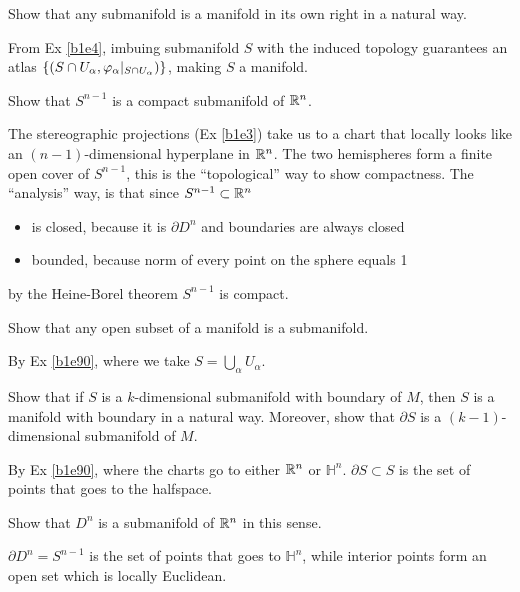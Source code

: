 \documentclass[10pt]{article}
\begin{document}
\begin{example}\label{b1e90}
	Show that any submanifold is a manifold in its own right in a natural way.
\end{example}
\sol From Ex \ref{b1e4}, imbuing submanifold $S$ with the induced topology guarantees an atlas $\lbrace(S \cap U_\alpha, \varphi_\alpha|_{S \cap U_\alpha})\rbrace$, making $S$ a manifold.


\begin{example}
	Show that $S^{n-1}$ is a compact submanifold of $\mathbb{R}^n$.
\end{example}
\sol The stereographic projections (Ex \ref{b1e3}) take us to a chart that locally looks like an $(n-1)$-dimensional hyperplane in $\mathbb{R}^n$. The two hemispheres form a finite open cover of $S^{n-1}$, this is the ``topological'' way to show compactness. The ``analysis'' way, is that since $S^{n-1} \subset \mathbb{R}^n$
\begin{itemize}
	\item is closed, because it is $\partial D^n$ and boundaries are always closed
	\item bounded, because norm of every point on the sphere equals 1
\end{itemize}by the Heine-Borel theorem $S^{n-1}$ is compact.



\begin{example}
	Show that any open subset of a manifold is a submanifold.
\end{example}
\sol By Ex \ref{b1e90}, where we take $S = \bigcup_\alpha U_\alpha$.


\begin{example}
	Show that if $S$ is a $k$-dimensional submanifold with boundary of $M$, then $S$ is a manifold with boundary in a natural way. Moreover, show that $\partial S$ is a $(k-1)$-dimensional submanifold of $M$.
\end{example}
\sol By Ex \ref{b1e90}, where the charts go to either $\mathbb{R}^n$ or $\mathbb{H}^n$. $\partial S \subset S$ is the set of points that goes to the halfspace.


\begin{example}
	Show that $D^n$ is a submanifold of $\mathbb{R}^n$ in this sense.
\end{example}
\sol $\partial D^n = S^{n-1}$ is the set of points that goes to $\mathbb{H}^n$, while interior points form an open set which is locally Euclidean.
\end{document}
